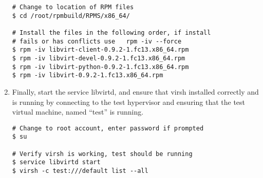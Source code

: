 \begin{enumerate}
\begin{lstlisting}
# Change to location of RPM files
$ cd /root/rpmbuild/RPMS/x86_64/

# Install the files in the following order, if install
# fails or has conflicts use   rpm -iv --force   
$ rpm -iv libvirt-client-0.9.2-1.fc13.x86_64.rpm 
$ rpm -iv libvirt-devel-0.9.2-1.fc13.x86_64.rpm
$ rpm -iv libvirt-python-0.9.2-1.fc13.x86_64.rpm
$ rpm -iv libvirt-0.9.2-1.fc13.x86_64.rpm
\end{lstlisting}

\item 	Finally, start the service libvirtd, and ensure that virsh installed correctly and is running by 
		connecting to the test hypervisor and ensuring that the test virtual machine, named ``test'' is running.

\lstset{language=bash,caption=Verify virsh was Installed Properly}
\begin{lstlisting}
# Change to root account, enter password if prompted
$ su

# Verify virsh is working, test should be running
$ service libvirtd start
$ virsh -c test:///default list --all
\end{lstlisting}
\end{enumerate}


\newpage
